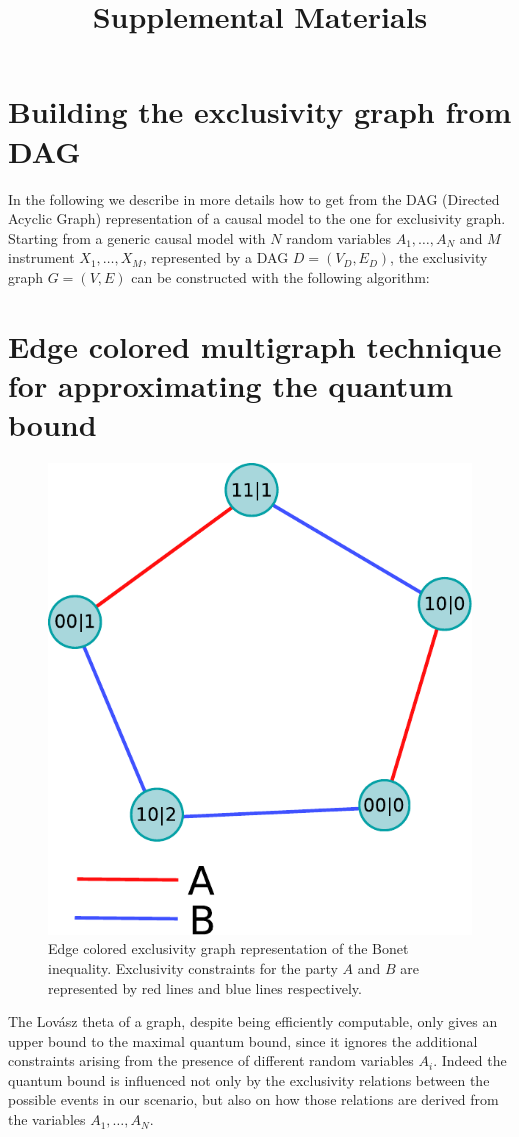 \documentclass[letterpaper]{article}
\begin{document}
\title{Supplemental Materials}
\maketitle
\section*{Building the exclusivity graph from DAG}
In the following we describe in more details how to get from the DAG
(Directed Acyclic Graph) representation of a causal model to the one
for exclusivity graph.
Starting from a generic causal model with $N$ random variables
$A_1,\ldots,A_N$ and $M$ instrument $X_1,\ldots,X_M$, represented by a
DAG $D=(V_D, E_D)$, the exclusivity graph $G = (V, E)$ can be constructed with the following algorithm:

\section*{Edge colored multigraph technique for approximating the quantum
bound}
\begin{figure}[t]
    \centering
    \includegraphics[width=.7\columnwidth]{images/instrumental_multigraph.pdf}
    \caption{Edge colored exclusivity graph representation of the Bonet
        inequality. Exclusivity constraints for the party $A$ and $B$ are
    represented by red lines and blue lines respectively.}
    \label{fig:instrumental_multigraph}
\end{figure}

The Lov\'asz theta of a graph, despite being efficiently computable,
only gives an upper bound to the maximal quantum bound, since it ignores
the additional constraints arising from the presence of different random
variables $A_i$.
Indeed the quantum bound is influenced not only by the exclusivity relations between the
possible events in our scenario, but also on how those relations are derived from the
variables $A_1,\ldots,A_N$.
\end{document}
